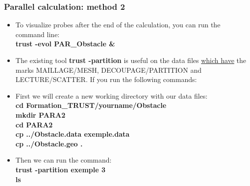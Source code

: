 \documentclass[10pt, hyperref={unicode=true,pdfusetitle, bookmarks=true,bookmarksnumbered=false,bookmarksopen=false, breaklinks=false,pdfborder={0 0 1},backref=true,colorlinks=true,linkcolor=darkblue,pageanchor}]{beamer}
\begin{document}
\begin{frame}
\frametitle{Parallel calculation: method 2} \label{exo_para_2}
\begin{block}{}

\begin{itemize}
\item To visualize probes after the end of the calculation, you can run the command line:\\
\textbf{trust -evol PAR\_Obstacle \&}

\item The existing tool \textbf{trust -partition} is useful on the data files \underline{which have} the marks MAILLAGE/MESH, DECOUPAGE/PARTITION and LECTURE/SCATTER. If you run the following commands: \\
\vspace{0.2cm}

\item First we will create a new working directory with our data files:\\
\textbf{cd Formation\_TRUST/yourname/Obstacle} \\
\textbf{mkdir PARA2} \\
\textbf{cd PARA2} \\
\textbf{cp ../Obstacle.data exemple.data}\\
\textbf{cp ../Obstacle.geo .}\\
\vspace{0.2cm}

\item Then we can run the command:\\
\textbf{trust -partition exemple 3}\\
\textbf{ls}
\end{itemize}

\end{block}
\end{frame}
\end{document}
